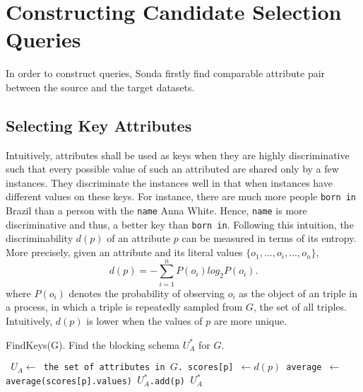 \section{Constructing Candidate Selection Queries} 
In order to construct queries, Sonda firstly find comparable attribute pair between the source and the target datasets. 

\subsection{Selecting Key Attributes}
Intuitively, attributes shall be used as keys when they are highly discriminative such that every possible value of such an attributed are shared only by a few instances. They discriminate the instances well in that when instances have different values on these keys.
For instance, there are much more people \verb+born in+ Brazil than a person with the \verb+name+ Anna White. Hence, \verb+name+ is more discriminative and thus, a better key than \verb+born in+. Following this intuition, the discriminability $d(p)$ of an attribute $p$ can be measured in terms of its entropy. More precisely, given an attribute and its literal values $\{o_1,\ldots,o_i,\ldots,o_n\}$, 
\begin{equation}
d(p) = - \sum_{i=1}^{n} P(o_i)log_2P(o_i).
\end{equation}
where $P(o_i)$ denotes the probability of observing $o_i$ as the object of an triple in a process, in which a triple is repeatedly sampled from $G$, the set of all triples. Intuitively, $d(p)$ is lower when the values of $p$ are more unique.  

\begin{algorithm}
\caption{FindKeys(G). Find the blocking schema $U^*_A$ for $G$.}
\begin{algorithmic}
\scriptsize\tt
\STATE $U_A \leftarrow$ the set of attributes in $G$. 
\STATE scores[p] $\leftarrow d(p)$
\ENDFOR
\STATE average $\leftarrow$ average(scores[p].values)
\STATE $U^*_A$.add(p)
\ENDIF
\ENDFOR
\RETURN $U^*_A$
\end{algorithmic}
\end{algorithm}

